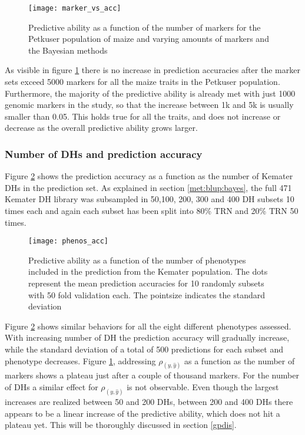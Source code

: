 \begin{figure}[H]
 \centering \texttt{[image: marker\_vs\_acc]}
 \decoRule
 \caption[Predictive ability as a function of the number of markers]{Predictive ability as
   a function of the number of markers for the Petkuser population of maize and varying
   amounts of markers and the Bayesian methods}
\label{fig:marker_vs_acc}
\end{figure}

As visible in figure \ref{fig:marker_vs_acc} there is no increase in prediction accuracies
after the marker sets exceed 5000 markers for all the maize traits in the Petkuser
population. Furthermore, the majority of the predictive ability is already met with just
1000 genomic markers in the study, so that the increase between 1k and 5k is usually
smaller than 0.05. This holds true for all the traits, and does not increase or decrease
as the overall predictive ability grows larger.

\subsubsection{Number of DHs and prediction accuracy}

Figure \ref{fig:phenos_vs_acc} shows the prediction accuracy as a function as the number
of Kemater DHs in the prediction set. As explained in section \ref{met:blup:bayes}, the
full 471 Kemater DH library was subsampled in 50,100, 200, 300 and 400 DH subsets 10 times
each and again each subset has been split into 80\% TRN and 20\% TRN 50 times.

\begin{figure}[H]
 \centering \texttt{[image: phenos\_acc]}
 \decoRule
 \caption[Predictive ability as a function of the number of markers]{Predictive ability as
   a function of the number of phenotypes included in the prediction from the Kemater
   population. The dots represent the mean prediction accuracies for 10 randomly subsets
   with 50 fold validation each. The pointsize indicates the standard deviation}
\label{fig:phenos_vs_acc}
\end{figure}

Figure \ref{fig:phenos_vs_acc} shows similar behaviors for all the eight different
phenotypes assessed. With increasing number of DH the prediction accuracy will gradually
increase, while the standard deviation of a total of 500 predictions for each subset and
phenotype decreases. Figure \ref{fig:marker_vs_acc}, addressing $\rho_{(y,\hat{y})}$ as a
function as the number of markers shows a plateau just after a couple of thousand
markers. For the number of DHs a similar effect for $\rho_{(y,\hat{y})}$ is not
observable. Even though the largest increases are realized between 50 and 200 DHs, between
200 and 400 DHs there appears to be a linear increase of the predictive ability, which
does not hit a plateau yet. This will be thoroughly discussed in section \ref{gpdis}.

